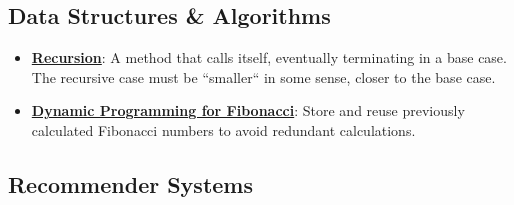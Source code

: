 \documentclass{article}%
\begin{document}
\subsection{Data Structures \& Algorithms}%
\label{subsec:DataStructuresAlgorithms}%
\begin{itemize}[leftmargin=*]%
\item \href{https://purdue.brightspace.com/d2l/common/assets/pdfjs-d2l-dist/1.0.14-legacy/web/viewer.html?file=\%2Fcontent\%2Fenforced\%2F1095467-wl.202510.CS.24300.001\%2F14L1-DepthFS.pdf\%3Fou\%3D1095467\&lang=en-us\&container=d2l-fileviewer-rendered-pdf\&fullscreen=d2l-fileviewer-rendered-pdf-dialog\&height=667#page=3}{\textbf{Recursion}}: A method that calls itself, eventually terminating in a base case. The recursive case must be ``smaller`` in some sense, closer to the base case.%
\item \href{https://purdue.brightspace.com/d2l/common/assets/pdfjs-d2l-dist/1.0.14-legacy/web/viewer.html?file=\%2Fcontent\%2Fenforced\%2F1095467-wl.202510.CS.24300.001\%2F14L1-DepthFS.pdf\%3Fou\%3D1095467\&lang=en-us\&container=d2l-fileviewer-rendered-pdf\&fullscreen=d2l-fileviewer-rendered-pdf-dialog\&height=667#page=23}{\textbf{Dynamic Programming for Fibonacci}}: Store and reuse previously calculated Fibonacci numbers to avoid redundant calculations.%
\end{itemize}

%
\subsection{Recommender Systems}%
\label{subsec:RecommenderSystems}%

%
\end{document}
